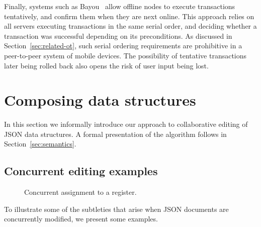 \documentclass[10pt,journal,compsoc]{IEEEtran}
\begin{document}
Finally, systems such as Bayou~\cite{Terry:1995dn} allow offline nodes to execute transactions tentatively, and confirm them when they are next online. This approach relies on all servers executing transactions in the same serial order, and deciding whether a transaction was successful depending on its preconditions. As discussed in Section~\ref{sec:related-ot}, such serial ordering requirements are prohibitive in a peer-to-peer system of mobile devices. The possibility of tentative transactions later being rolled back also opens the risk of user input being lost.


\section{Composing data structures}\label{sec:composing}

In this section we informally introduce our approach to collaborative editing of JSON data structures. A formal presentation of the algorithm follows in Section~\ref{sec:semantics}.

\subsection{Concurrent editing examples}\label{sec:examples}

\begin{figure}
\centering
{}
\caption{Concurrent assignment to a register.}\label{fig:register-assign}
\end{figure}

To illustrate some of the subtleties that arise when JSON documents are concurrently modified, we present some examples.
\end{document}
